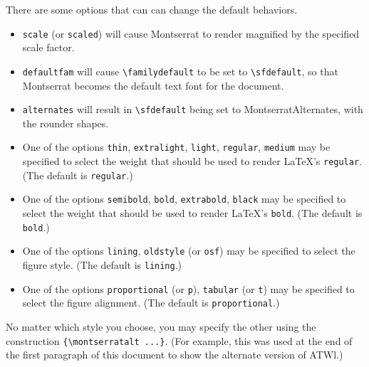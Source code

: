 \documentclass[11pt]{article}
\begin{document}
There are some options that can can change the default behaviors.
\begin{itemize}
\item {\tt scale} (or {\tt scaled}) will cause Montserrat to render magnified by the specified scale factor.
\item
{\tt defaultfam} will cause \verb|\familydefault| to be set to \verb|\sfdefault|, so that Montserrat becomes the default text font for the document.
\item {\tt alternates} will result in \verb|\sfdefault| being set to MontserratAlternates, with the rounder shapes.
\item One of the options {\tt thin}, {\tt extralight}, {\tt light}, {\tt regular}, {\tt medium} may be specified to select the weight that should be used to render \LaTeX's {\tt regular}. (The default is {\tt regular}.)
\item One of the options  {\tt semibold}, {\tt bold}, {\tt extrabold}, {\tt black} may be specified to select the weight that should be used to render \LaTeX's {\tt bold}. (The default is {\tt bold}.)
\item One of the options {\tt lining}, {\tt oldstyle} (or {\tt osf}) may be specified to select the figure style. (The default is {\tt lining}.)
\item One of the options {\tt proportional} (or {\tt p}), {\tt tabular} (or {\tt t}) may be specified to select the figure alignment. (The default is {\tt proportional}.)
\end{itemize}
No matter which style you choose, you may specify the other using the construction \verb|{\montserratalt ...}|. (For example, this was used at the end of the first paragraph of this document to show the alternate version of ATWl.)

%
%
\end{document}
